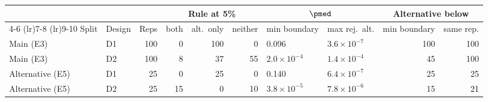 \begin{tabular}{llrrrrllrr}
\toprule
 & & & \multicolumn{3}{c}{Rule at 5\%} & \multicolumn{2}{c}{$\pmed$} & \multicolumn{2}{c}{Alternative below} \\
\cmidrule(lr){4-6} \cmidrule(lr){7-8} \cmidrule(lr){9-10}
Split & Design & Reps & both & alt.\ only & neither & min boundary & max rej.\ alt. & min boundary & same rep. \\
\midrule
Main (E3) & D1 & 100 & 0 & 100 & 0 & 0.096 & $3.6\times10^{-7}$ & 100 & 100 \\
Main (E3) & D2 & 100 & 8 & 37 & 55 & $2.0\times10^{-4}$ & $1.4\times10^{-4}$ & 45 & 100 \\
Alternative (E5) & D1 & 25 & 0 & 25 & 0 & 0.140 & $6.4\times10^{-7}$ & 25 & 25 \\
Alternative (E5) & D2 & 25 & 15 & 0 & 10 & $3.8\times10^{-5}$ & $7.8\times10^{-6}$ & 15 & 21 \\
\bottomrule
\end{tabular}
